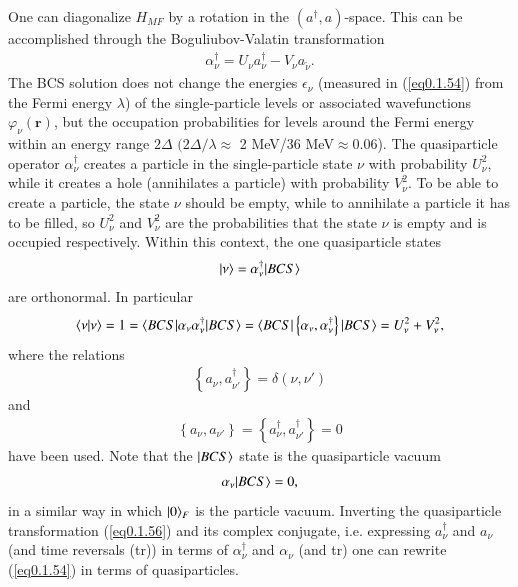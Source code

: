 One can diagonalize $H_{MF}$ by a rotation in the $(a^\dagger,a)$-space. This can be accomplished through the Boguliubov-Valatin transformation
\begin{align}\label{eq0.1.56}
\alpha^\dagger_\nu=U_\nu a^\dagger_\nu-V_\nu a_{\tilde\nu}.
\end{align}
The BCS solution does not change the energies $\epsilon_\nu$ (measured in (\ref{eq0.1.54}) from the Fermi energy $\lambda$) of the single-particle levels or associated wavefunctions $\varphi_{\nu}(\mathbf r)$, but the occupation probabilities for levels around the Fermi energy within an energy range $2\Delta$ $(2\Delta/\lambda\approx$ 2 MeV/36 MeV$\approx0.06$). The quasiparticle operator $\alpha^\dagger_\nu$ creates a particle in the single-particle state $\nu$ with probability $U^2_\nu$, while it creates a hole (annihilates a particle) with probability $V^2_\nu$. To be able to create a particle, the state $\nu$ should be empty, while to annihilate a particle it has to be filled, so $U^2_\nu$ and $V^2_\nu$ are the probabilities  that the state $\nu$ is empty and is occupied respectively. Within this context, the one quasiparticle states   
\begin{align}\label{eq0.1.57}
|{\nu} \rangle=\alpha^\dagger_\nu|{BCS} \rangle
\end{align}
are orthonormal. In particular
\begin{align}\label{eq0.1.58}
\langle {\nu|\nu} \rangle=1=\langle {BCS|\alpha_{\nu}\alpha^\dagger_\nu|BCS} \rangle=\langle {BCS|\left\{\alpha_{\nu},\alpha^\dagger_\nu\right\}|BCS} \rangle=U^2_\nu+V^2_\nu,
\end{align}
where the relations
\begin{align}\label{eq0.1.59}
\left\{a_{\nu},a^\dagger_{\nu'}\right\}=\delta(\nu,\nu')
\end{align}
and
\begin{align}\label{eq0.1.60}
\left\{a_{\nu},a_{\nu'}\right\}=\left\{a^\dagger_{\nu},a^\dagger_{\nu'}\right\}=0
\end{align}
have been used. Note that the $|{BCS} \rangle$ state is the quasiparticle vacuum
\begin{align}\label{eq0.1.61}
\alpha_\nu|{BCS} \rangle=0,
\end{align}
in a similar way in which $|{0} \rangle_F$ is the particle vacuum. Inverting the quasiparticle transformation (\ref{eq0.1.56}) and its complex conjugate, i.e. expressing $a_\nu^\dagger$ and $a_\nu$ (and time reversals (tr)) in terms of $\alpha^\dagger_\nu$ and $\alpha_\nu$ (and tr) one can rewrite (\ref{eq0.1.54}) in terms of quasiparticles.

